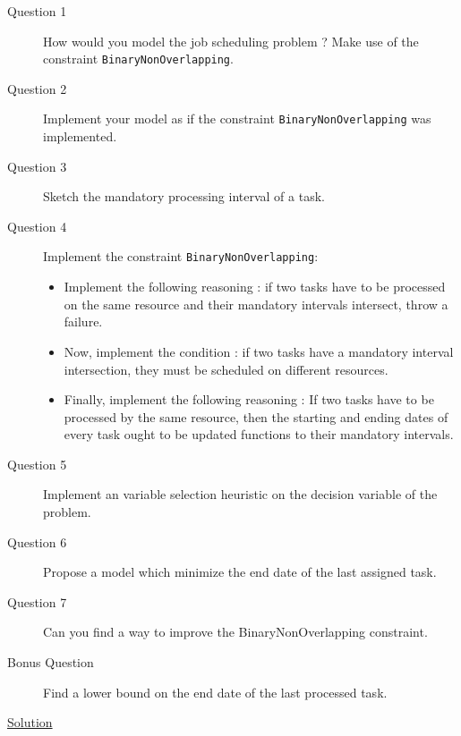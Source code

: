 \begin{description}
	\item[Question 1] How would you model the job scheduling problem ? Make use of the constraint \texttt{BinaryNonOverlapping}.
	\item[Question 2] Implement your model as if the constraint \texttt{BinaryNonOverlapping} was implemented.
	\item[Question 3] Sketch the mandatory processing interval of a task.
	\item[Question 4] Implement the constraint \texttt{BinaryNonOverlapping}:
	\begin{itemize}
		\item Implement the following reasoning : if two tasks have to be processed on the same resource and their mandatory intervals intersect, throw a failure.
		\item Now, implement the condition : if two tasks have a mandatory interval intersection, they must be scheduled on different resources.
		\item Finally, implement the following reasoning : If two tasks have to be processed by the same resource, then the starting and ending dates of every task ought to be updated functions to their mandatory intervals.
	\end{itemize}
	\item[Question 5] Implement an variable selection heuristic on the decision variable of the problem.
	\item[Question 6] Propose a model which minimize the end date of the last assigned task.
	\item[Question 7] Can you find a way to improve the BinaryNonOverlapping constraint.
	\item[Bonus Question] Find a lower bound on the end date of the last processed task.
\end{description}

\hyperlink{solutions:solutionofexercise3.2}{Solution}
